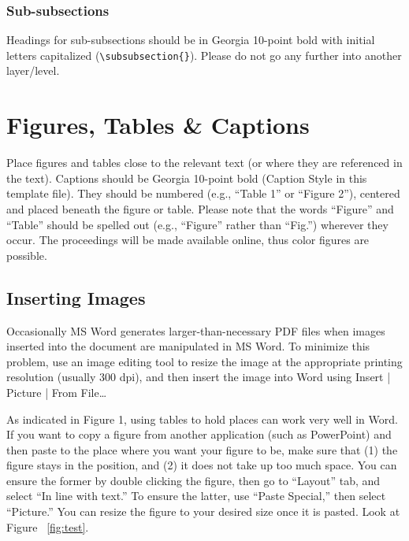 \documentclass{icis}
\begin{document}
\subsubsection{Sub-subsections}
Headings for sub-subsections should be in Georgia 10-point bold with initial
letters capitalized (\texttt{\textbackslash subsubsection\{\}}). Please do not
go any further into another layer/level.

\section{Figures, Tables \& Captions}
Place figures and tables close to the relevant text (or where they are
referenced in the text).  Captions should be Georgia 10-point bold (Caption
Style in this template file).  They should be numbered (e.g., ``Table 1'' or
``Figure 2''), centered and placed beneath the figure or table.  Please note that
the words ``Figure'' and ``Table'' should be spelled out (e.g., ``Figure'' rather than ``Fig.'') wherever they occur. The proceedings will be made available online, thus color figures are possible.

\subsection{Inserting Images}
Occasionally MS Word generates larger-than-necessary PDF files when images
inserted into the document are manipulated in MS Word. To minimize this
problem, use an image editing tool to resize the image at the appropriate
printing resolution (usually 300 dpi), and then insert the image into Word using
Insert | Picture | From File\ldots

As indicated in Figure 1, using tables to hold places can work very well in
Word. If you want to copy a figure from another application (such as PowerPoint)
and then paste to the place where you want your figure to be, make sure that (1)
the figure stays in the position, and (2) it does not take up too much
space. You can ensure the former by double clicking the figure, then go to
``Layout'' tab, and select ``In line with text.'' To ensure the latter, use ``Paste
Special,'' then select ``Picture.'' You can resize the figure to your desired size
once it is pasted. Look at Figure ~\ref{fig:test}.
\end{document}
